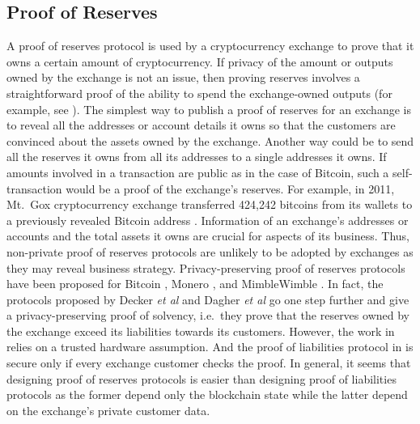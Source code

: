 \subsection{Proof of Reserves}

A proof of reserves protocol is used by a cryptocurrency exchange to prove that it owns a certain amount of cryptocurrency. 
If privacy of the amount or outputs owned by the exchange is not an issue, then proving reserves involves a straightforward proof of the ability to spend the exchange-owned outputs (for example, see \cite{BlockstreamProofOfReserves}). 
The simplest way to publish a proof of reserves for an exchange is to reveal all the addresses or account details it owns so that the customers are convinced about the assets owned by the exchange.
Another way could be to send all the reserves it owns from all its addresses to a single addresses it owns.
If amounts involved in a transaction are public as in the case of Bitcoin, such a self-transaction would be a proof of the exchange's reserves.
For example, in 2011, Mt.~Gox cryptocurrency exchange transferred 424,242 bitcoins from its wallets to a previously revealed Bitcoin address \cite{MtGoxWikipedia}.
Information of an exchange's addresses or accounts and the total assets it owns are crucial for aspects of its business.
Thus, non-private proof of reserves protocols are unlikely to be adopted by exchanges as they may reveal business strategy. 
Privacy-preserving proof of reserves protocols have been proposed for Bitcoin \cite{Decker2015,Dagher2015}, Monero \cite{Dutta2019a}, and MimbleWimble \cite{Dutta2019b}. 
In fact, the protocols proposed by Decker \textit{et al} \cite{Decker2015} and Dagher \textit{et al} \cite{Dagher2015} go one step further and give a privacy-preserving proof of solvency, i.e.~they prove that the reserves owned by the exchange exceed its liabilities towards its customers. 
However, the work in \cite{Decker2015} relies on a trusted hardware assumption. And the proof of liabilities protocol in \cite{Dagher2015} is secure only if every exchange customer checks the proof. 
In general, it seems that designing proof of reserves protocols is easier than designing proof of liabilities protocols as the former depend only the blockchain state while the latter depend on the exchange's private customer data.

